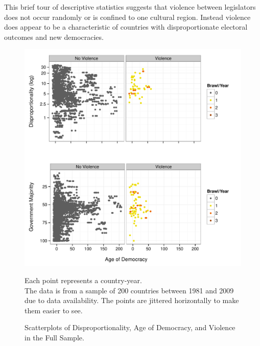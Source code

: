 \documentclass[a4paper]{article}\usepackage{graphicx, color}
\newenvironment{knitrout}{}{} %
\begin{document}
This brief tour of descriptive statistics suggests that violence between legislators does not occur randomly or is confined to one cultural region. Instead violence does appear to be a characteristic of countries with disproportionate electoral outcomes and new democracies.

\begin{figure}[t]
    \caption{Scatterplots of Disproportionality, Age of Democracy, and Violence in the Full Sample.}  
    \label{framework_empirical}
    \begin{center}

\begin{knitrout}
\color{fgcolor}
\includegraphics[width=0.8\linewidth]{figure/FrameworkEmpirical} 

\end{knitrout}

    \end{center}
    \begin{singlespace}
        {\scriptsize{Each point represents a country-year. \\ The data is from a sample of 200 countries between 1981 and 2009 due to data availability. The points are jittered horizontally to make them easier to see.}}
    \end{singlespace}

\end{figure}
\end{document}
